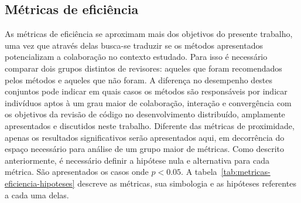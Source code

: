\documentclass[12pt,openany,oneside,a4paper,english,brazil]{abntbibufjf}
\begin{document}
\subsection{Métricas de eficiência}

As métricas de eficiência se aproximam mais dos objetivos do presente trabalho, uma vez que através delas busca-se traduzir se os métodos apresentados potencializam a colaboração no contexto estudado. Para isso é necessário comparar dois grupos distintos de revisores: aqueles que foram recomendados pelos métodos e aqueles que não foram. A diferença no desempenho destes conjuntos pode indicar em quais casos os métodos são responsáveis por indicar indivíduos aptos à um grau maior de colaboração, interação e convergência com os objetivos da revisão de código no desenvolvimento distribuído, amplamente apresentados e discutidos neste trabalho. Diferente das métricas de proximidade, apenas os resultados significativos serão apresentados aqui, em decorrência do espaço necessário para análise de um grupo maior de métricas. Como descrito anteriormente, é necessário definir a hipótese nula e alternativa para cada métrica. São apresentados os casos onde $p < 0.05$. A tabela~\ref{tab:metricas-eficiencia-hipoteses} descreve as métricas, sua simbologia e as hipóteses referentes a cada uma delas.
\end{document}
